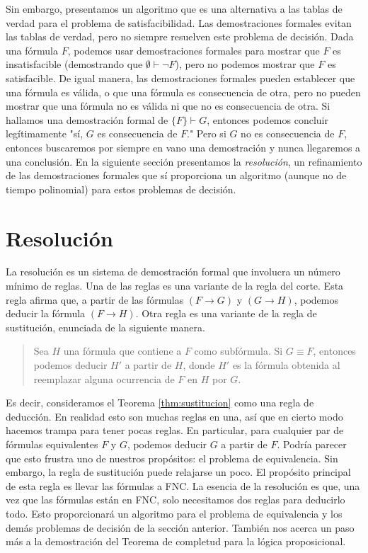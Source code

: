 \documentclass[12pt,a4paper]{book}
\newcommand{\comillas}[1]{"#1"}
\begin{document}
    Sin embargo, presentamos un algoritmo que es una alternativa a las tablas de verdad para el problema de satisfacibilidad.
    Las demostraciones formales evitan las tablas de verdad, pero no siempre resuelven este problema de decisión. Dada una
    fórmula $F$, podemos usar demostraciones formales para mostrar que $F$ es insatisfacible (demostrando que
    $\emptyset\vdash\neg F$), pero no podemos mostrar que $F$ es satisfacible. De igual manera, las demostraciones formales
    pueden establecer que una fórmula es válida, o que una fórmula es consecuencia de otra, pero no pueden mostrar que una
    fórmula no es válida ni que no es consecuencia de otra. Si hallamos una demostración formal de $\{F\}\vdash G$, entonces
    podemos concluir legítimamente \comillas{sí, $G$ es consecuencia de $F$.} Pero si $G$ no es consecuencia de $F$,
    entonces buscaremos por siempre en vano una demostración y nunca llegaremos a una conclusión. En la siguiente sección
    presentamos la \textit{resolución}, un refinamiento de las demostraciones formales que sí proporciona un algoritmo
    (aunque no de tiempo polinomial) para estos problemas de decisión.

    \section{Resolución}

    La resolución es un sistema de demostración formal que involucra un número mínimo de reglas. Una de las reglas es una
    variante de la regla del corte. Esta regla afirma que, a partir de las fórmulas $(F\rightarrow G)$ y $(G\rightarrow H)$,
    podemos deducir la fórmula $(F\rightarrow H)$. Otra regla es una variante de la regla de sustitución, enunciada de la
    siguiente manera.

    \begin{quote}
        Sea $H$ una fórmula que contiene a $F$ como subfórmula. Si $G\equiv F$, entonces podemos deducir $H'$ a partir de $H$,
        donde $H'$ es la fórmula obtenida al reemplazar alguna ocurrencia de $F$ en $H$ por $G$.
    \end{quote}

    Es decir, consideramos el Teorema \ref{thm:sustitucion} como una regla de deducción. En realidad esto son muchas reglas
    en una, así que en cierto modo hacemos trampa para tener pocas reglas. En particular, para cualquier par de fórmulas
    equivalentes $F$ y $G$, podemos deducir $G$ a partir de $F$. Podría parecer que esto frustra uno de nuestros propósitos:
    el problema de equivalencia. Sin embargo, la regla de sustitución puede relajarse un poco. El propósito principal de esta
    regla es llevar las fórmulas a FNC. La esencia de la resolución es que, una vez que las fórmulas están en FNC, solo
    necesitamos dos reglas para deducirlo todo. Esto proporcionará un algoritmo para el problema de equivalencia y los demás
    problemas de decisión de la sección anterior. También nos acerca un paso más a la demostración del Teorema de
    completud para la lógica proposicional.
\end{document}
